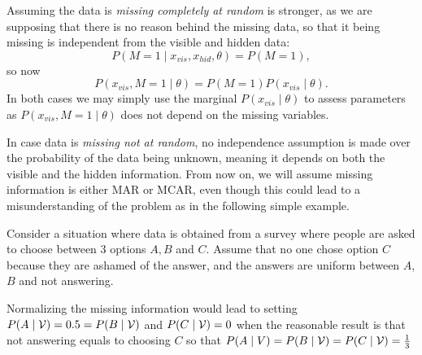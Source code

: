 Assuming the data is \emph{missing completely at random} is stronger, as we are supposing that there is no reason behind the missing data, so that it being missing is independent from the visible and hidden data:
\[
  P(M = 1 \mid x_{vis}, x_{hid}, \theta) = P(M = 1),
\]
so now
\[
    P( x_{vis}, M = 1 \mid \theta) = P(M = 1)P( x_{vis} \mid \theta).
\]
In both cases we may simply use the marginal \(P(x_{vis} \mid \theta)\) to assess parameters as \(P( x_{vis}, M = 1 \mid \theta)\) does not depend on the missing variables.

In case data is \emph{missing not at random}, no independence assumption is made over the probability of the data being unknown, meaning it depends on both the visible and the hidden information. From now on, we will assume missing information is either MAR or MCAR, even though this could lead to a misunderstanding of the problem as in the following simple example.

\begin{exampleth}
  Consider a situation where data is obtained from a survey where people are asked to choose between 3 options \(A, B\) and \(C\). Assume that no one chose option \(C\) because they are ashamed of the answer, and the answers are uniform between \(A\), \(B\) and not answering.

  Normalizing the missing information would lead to setting \(P(A \mid \mathcal{V}) = 0.5 = P(B \mid \mathcal{V})\) and \(P(C \mid \mathcal{V}) = 0\) when the reasonable result is that not answering equals to choosing \(C\) so that \(P(A \mid V) = P(B \mid \mathcal{V}) = P(C \mid \mathcal{V}) = \frac{1}{3}\)
\end{exampleth}
